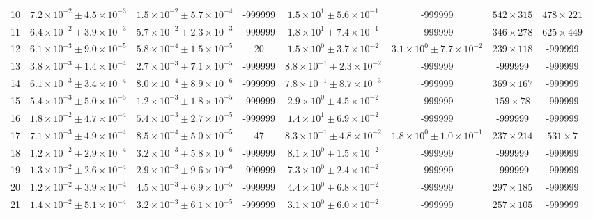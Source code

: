 \begin{table}
\begin{tabular}{cccccccc}
10 & $7.2\times10^{-2}\pm 4.5\times10^{-3}$ & $1.5\times10^{-2}\pm 5.7\times10^{-4}$ & -999999 & $1.5\times10^{1}\pm 5.6\times10^{-1}$ & -999999 & $542\times 315$ & $478\times 221$ \\
11 & $6.4\times10^{-2}\pm 3.9\times10^{-3}$ & $5.7\times10^{-2}\pm 2.3\times10^{-3}$ & -999999 & $1.8\times10^{1}\pm 7.4\times10^{-1}$ & -999999 & $346\times 278$ & $625\times 449$ \\
12 & $6.1\times10^{-3}\pm 9.0\times10^{-5}$ & $5.8\times10^{-4}\pm 1.5\times10^{-5}$ & 20 & $1.5\times10^{0}\pm 3.7\times10^{-2}$ & $3.1\times10^{0}\pm 7.7\times10^{-2}$ & $239\times 118$ & -999999 \\
13 & $3.8\times10^{-3}\pm 1.4\times10^{-4}$ & $2.7\times10^{-3}\pm 7.1\times10^{-5}$ & -999999 & $8.8\times10^{-1}\pm 2.3\times10^{-2}$ & -999999 & -999999 & -999999 \\
14 & $6.1\times10^{-3}\pm 3.4\times10^{-4}$ & $8.0\times10^{-4}\pm 8.9\times10^{-6}$ & -999999 & $7.8\times10^{-1}\pm 8.7\times10^{-3}$ & -999999 & $369\times 167$ & -999999 \\
15 & $5.4\times10^{-3}\pm 5.0\times10^{-5}$ & $1.2\times10^{-3}\pm 1.8\times10^{-5}$ & -999999 & $2.9\times10^{0}\pm 4.5\times10^{-2}$ & -999999 & $159\times 78$ & -999999 \\
16 & $1.8\times10^{-2}\pm 4.7\times10^{-4}$ & $5.4\times10^{-3}\pm 2.7\times10^{-5}$ & -999999 & $1.4\times10^{1}\pm 6.9\times10^{-2}$ & -999999 & -999999 & -999999 \\
17 & $7.1\times10^{-3}\pm 4.9\times10^{-4}$ & $8.5\times10^{-4}\pm 5.0\times10^{-5}$ & 47 & $8.3\times10^{-1}\pm 4.8\times10^{-2}$ & $1.8\times10^{0}\pm 1.0\times10^{-1}$ & $237\times 214$ & $531\times 7$ \\
18 & $1.2\times10^{-2}\pm 2.9\times10^{-4}$ & $3.2\times10^{-3}\pm 5.8\times10^{-6}$ & -999999 & $8.1\times10^{0}\pm 1.5\times10^{-2}$ & -999999 & -999999 & -999999 \\
19 & $1.3\times10^{-2}\pm 2.6\times10^{-4}$ & $2.9\times10^{-3}\pm 9.6\times10^{-6}$ & -999999 & $7.3\times10^{0}\pm 2.4\times10^{-2}$ & -999999 & -999999 & -999999 \\
20 & $1.2\times10^{-2}\pm 3.9\times10^{-4}$ & $4.5\times10^{-3}\pm 6.9\times10^{-5}$ & -999999 & $4.4\times10^{0}\pm 6.8\times10^{-2}$ & -999999 & $297\times 185$ & -999999 \\
21 & $1.4\times10^{-2}\pm 5.1\times10^{-4}$ & $3.2\times10^{-3}\pm 6.1\times10^{-5}$ & -999999 & $3.1\times10^{0}\pm 6.0\times10^{-2}$ & -999999 & $257\times 105$ & -999999 \\

\end{tabular}
\end{table}
